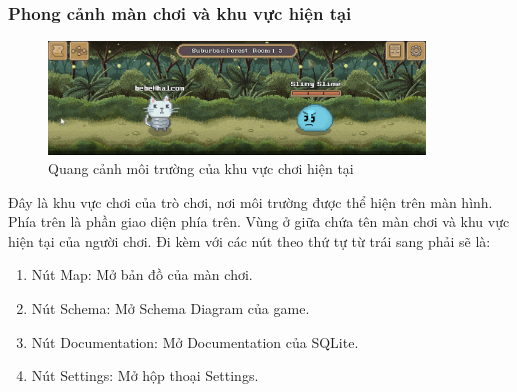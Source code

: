 \subsubsection{Phong cảnh màn chơi và khu vực hiện tại}
\begin{figure}[H]
	\centering
	\includegraphics[width=10cm]{Images/CurrentRoom.png}
	\vspace{0.5cm}
	\caption{Quang cảnh môi trường của khu vực chơi hiện tại}
\end{figure}
\hspace*{0.5cm} Đây là khu vực chơi của trò chơi, nơi môi trường được thể hiện trên màn hình.\\
\hspace*{0.5cm} Phía trên là phần giao diện phía trên. Vùng ở giữa chứa tên màn chơi và khu vực hiện tại của người chơi. Đi kèm với các nút theo thứ tự từ trái sang phải sẽ là: 
\begin{enumerate}
	\item Nút Map: Mở bản đồ của màn chơi.
	\item Nút Schema: Mở Schema Diagram của game.
	\item Nút Documentation: Mở Documentation của SQLite.
	\item Nút Settings: Mở hộp thoại Settings.
\end{enumerate}